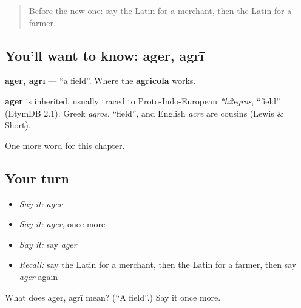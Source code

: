 \begin{quote}
Before the new one: say the Latin for a merchant, then the Latin for a farmer.
\end{quote}

\subsection*{You'll want to know: ager, agrī}
\textbf{ager, agrī} — \textquotedblleft{}a field\textquotedblright{}. Where the \textbf{agricola} works.

\begin{cousinweb}
\textbf{ager} is inherited, usually traced to Proto-Indo-European \emph{*h2egros}, \textquotedblleft{}field\textquotedblright{} (EtymDB 2.1). Greek \emph{agros}, \textquotedblleft{}field\textquotedblright{}, and English \emph{acre} are cousins (Lewis \& Short).
\end{cousinweb}

\begin{grammarlens}[title={What you've built}]
One more word for this chapter.
\end{grammarlens}

\subsection*{Your turn}
\begin{itemize}
\raggedright
  \item \emph{Say it:} \emph{ager}
  \item \emph{Say it:} \emph{ager}, once more
  \item \emph{Say it:} say \emph{ager}
  \item \emph{Recall:} say the Latin for a merchant, then the Latin for a farmer, then say \emph{ager} again
\end{itemize}

\begin{tcolorbox}[breakable,colback=teal!4,colframe=teal!35!black,title={Before you move on}]
What does ager, agrī mean? (\textquotedblleft{}A field\textquotedblright{}.) Say it once more.
\end{tcolorbox}
